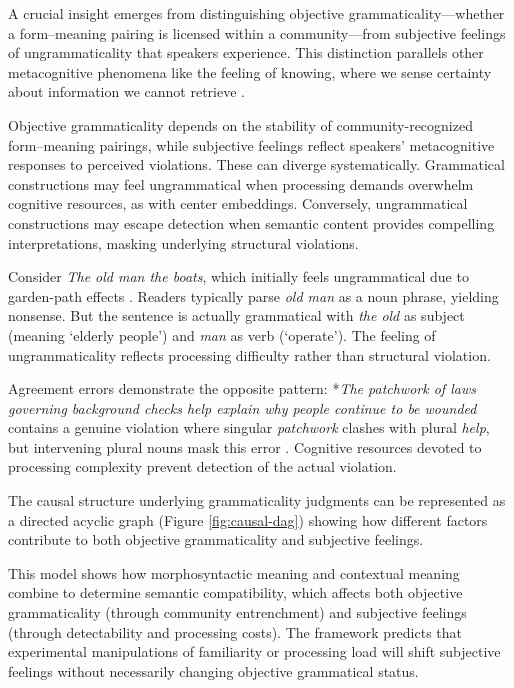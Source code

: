 \documentclass[12pt]{article}
\begin{document}
A crucial insight emerges from distinguishing objective grammaticality—whether a form–meaning pairing is licensed within a community—from subjective feelings of ungrammaticality that speakers experience. This distinction parallels other metacognitive phenomena like the feeling of knowing, where we sense certainty about information we cannot retrieve \parencite{hart1965}.

Objective grammaticality depends on the stability of community-recognized form–meaning pairings, while subjective feelings reflect speakers' metacognitive responses to perceived violations. These can diverge systematically. Grammatical constructions may feel ungrammatical when processing demands overwhelm cognitive resources, as with center embeddings. Conversely, ungrammatical constructions may escape detection when semantic content provides compelling interpretations, masking underlying structural violations.

Consider \textit{The old man the boats}, which initially feels ungrammatical due to garden-path effects \parencite{ritchie1984}. Readers typically parse \textit{old man} as a noun phrase, yielding nonsense. But the sentence is actually grammatical with \textit{the old} as subject (meaning `elderly people') and \textit{man} as verb (`operate'). The feeling of ungrammaticality reflects processing difficulty rather than structural violation.

Agreement errors demonstrate the opposite pattern: *\textit{The patchwork of laws governing background checks help explain why people continue to be wounded} contains a genuine violation where singular \textit{patchwork} clashes with plural \textit{help}, but intervening plural nouns mask this error \parencite{corbett2016}. Cognitive resources devoted to processing complexity prevent detection of the actual violation.

The causal structure underlying grammaticality judgments can be represented as a directed acyclic graph (Figure \ref{fig:causal-dag}) showing how different factors contribute to both objective grammaticality and subjective feelings.



This model shows how morphosyntactic meaning and contextual meaning combine to determine semantic compatibility, which affects both objective grammaticality (through community entrenchment) and subjective feelings (through detectability and processing costs). The framework predicts that experimental manipulations of familiarity or processing load will shift subjective feelings without necessarily changing objective grammatical status.
\end{document}
